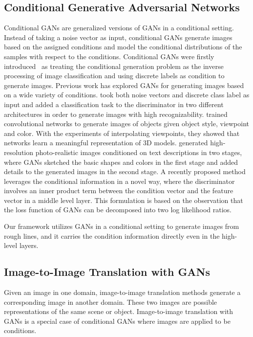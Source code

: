 \subsection{Conditional Generative Adversarial Networks}

Conditional GANs are generalized versions of GANs in a conditional setting. 
Instead of taking a noise vector as input, conditional GANs generate images based on the assigned conditions and model the conditional distributions of the samples with respect to the conditions. 
%
Conditional GANs were firstly introduced~\cite{cGANs} as treating the conditional generation problem as the inverse processing of image classification and using discrete labels as condition to generate images. 
Previous work has explored GANs for generating images based on a wide variety of conditions.
\cite{InfoGANs, ACGANs} took both noise vectors and discrete class label as input and added a classification task to the discriminator in two different architectures in order to generate images with high recognizability.   
%
\cite{3DGANs} trained convolutional networks to generate images of objects given object style, viewpoint and color. With the experiments of interpolating viewpoints, they showed that networks learn a meaningful representation of 3D models. 
%
\cite{StackGANs, StackGANs++} generated high-resolution photo-realistic images conditioned on text descriptions in two stages, where GANs sketched the basic shapes and colors in the first stage and added details to the generated images in the second stage.  
%
A recently proposed method~\cite{cGAN-projection} leverages the conditional information in a novel way, where the discriminator involves an inner product term between the condition vector and the feature vector in a middle level layer. This formulation is based on the observation that the loss function of GANs can be decomposed into two log likelihood ratios.
%

Our framework utilizes GANs in a conditional setting to generate images from rough lines, and it carries the condition information directly even in the high-level layers.

%
%
\subsection{Image-to-Image Translation with GANs}
Given an image in one domain, image-to-image translation methods generate a corresponding image in another domain. These two images are possible representations of the same scene or object. 
Image-to-image translation with GANs is a special case of conditional GANs where images are applied to be conditions. 
%

